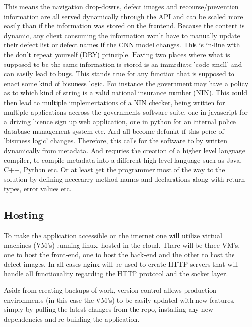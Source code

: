       This means the navigation drop-downs, defect images and recourse/prevention information are all served dynamically through the API and can be scaled more easily than if the information was stored on the frontend. Because the content is dynamic, any client consuming the information won't have to manually update their defect list or defect names if the CNN model changes. This is in-line with the don't repeat yourself (DRY) principle. Having two places where what is supposed to be the same information is stored is an immediate 'code smell' and can easily lead to bugs. This stands true for any function that is supposed to enact some kind of bisuness logic. For instance the government may have a policy as to which kind of string is a valid national insurance number (NIN). This could then lead to multiple implementations of a NIN checker, being written for multiple applications accross the governments software suite, one in javascript for a driving licence sign up web application, one in python for an internal police database management system etc. And all become defunkt if this peice of 'bisuness logic' changes. Therefore, this calls for the software to by written dynamically from metadata. And requries the creation of a higher level language compiler, to compile metadata into a different high level language such as Java, C++, Python etc. Or at least get the programmer most of the way to the solution by defining nececarry method names and declarations along with return types, error values etc.


    \subsection{Hosting}
      To make the application accessible on the internet one will utilize virtual machines (VM's) running linux, hosted in the cloud. There will be three VM's, one to host the front-end, one to host the back-end and the other to host the defect images. In all cases nginx will be used to create HTTP servers that will handle all functionality regarding the HTTP protocol and the socket layer.
      \par
      Aside from creating backups of work, version control allows production environments (in this case the VM's) to be easily updated with new features, simply by pulling the latest changes from the repo, installing any new dependencies and re-building the application.


